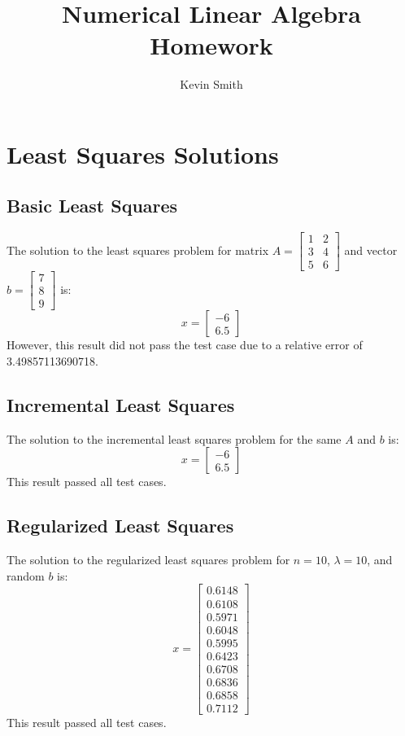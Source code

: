 \documentclass{article}
\title{Numerical Linear Algebra Homework}
\author{Kevin Smith}
\date{}
\begin{document}
\maketitle

\section*{Least Squares Solutions}

\subsection*{Basic Least Squares}
The solution to the least squares problem for matrix $A = \begin{bmatrix} 1 & 2 \\ 3 & 4 \\ 5 & 6 \end{bmatrix}$ and vector $b = \begin{bmatrix} 7 \\ 8 \\ 9 \end{bmatrix}$ is:
\[ x = \begin{bmatrix} -6 \\ 6.5 \end{bmatrix} \]
However, this result did not pass the test case due to a relative error of 3.49857113690718.

\subsection*{Incremental Least Squares}
The solution to the incremental least squares problem for the same $A$ and $b$ is:
\[ x = \begin{bmatrix} -6 \\ 6.5 \end{bmatrix} \]
This result passed all test cases.

\subsection*{Regularized Least Squares}
The solution to the regularized least squares problem for $n = 10$, $\lambda = 10$, and random $b$ is:
\[ x = \begin{bmatrix} 0.6148 \\ 0.6108 \\ 0.5971 \\ 0.6048 \\ 0.5995 \\ 0.6423 \\ 0.6708 \\ 0.6836 \\ 0.6858 \\ 0.7112 \end{bmatrix} \]
This result passed all test cases.
\end{document}
